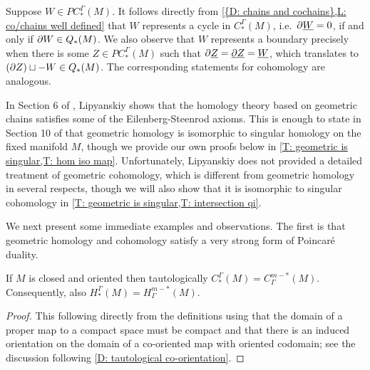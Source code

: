 \begin{comment}
	In Section 6 of \cite{Lipy14}, Lipyanskiy shows that the homology of $C_\Gamma^*(M)$, which we denote by $H_\Gamma^*(M)$,
	agrees with singular cohomology
	through the verification of homotopy and excision axioms.
	We find Mayer--Vietoris better for our applications, and we review both its verification
	and that of homotopy invariance as we need details about such constructions in our work.
\end{comment}

\begin{remark}\label{R: cycles and boundaries}
	Suppose $W \in PC_*^{\Gamma}(M)$. It follows directly from \cref{{D: chains and cochains},L: co/chains well defined} that $W$ represents a cycle in $C_*^{\Gamma}(M)$, i.e.\ $\partial \underline{W}=0$, if and only if $\partial W \in Q_*(M)$.
	We also observe that $W$ represents a boundary precisely when there is some $Z \in PC_*^\Gamma(M)$ such that $\partial \underline{Z} = \underline{\partial Z} = \underline{W}$, which translates to $(\partial Z) \sqcup -W \in Q_*(M)$.
	The corresponding statements for cohomology are analogous.
\end{remark}

In Section 6 of \cite{Lipy14}, Lipyanskiy shows that the homology theory based on geometric chains satisfies some of the Eilenberg-Steenrod axioms.
This is enough to state in Section 10 of \cite{Lipy14} that geometric homology is isomorphic to singular homology on the fixed manifold $M$, though we provide our own proofs below in \cref{T: geometric is singular,T: hom iso map}.
Unfortunately, Lipyanskiy does not provided a detailed treatment of geometric cohomology, which is different from geometric homology in several respects, though we will also show that it is isomorphic to singular cohomology in \cref{T: geometric is singular,T: intersection qi}.

We next present some immediate examples and observations. The first is that geometric homology and cohomology satisfy a very strong form of Poincar\'e duality.

\begin{theorem}\label{T: PD}
	If $M$ is closed and oriented then tautologically $C_*^\Gamma(M) = C_\Gamma^{m-*}(M)$.
	Consequently, also $H_*^\Gamma(M) = H_\Gamma^{m-*}(M)$.
\end{theorem}
\begin{proof}
	This following directly from the definitions using that the domain of a proper map to a compact space must be compact and that there is an induced orientation on the domain of a co-oriented map with oriented codomain; see the discussion following \cref{D: tautological co-orientation}.
\end{proof}



